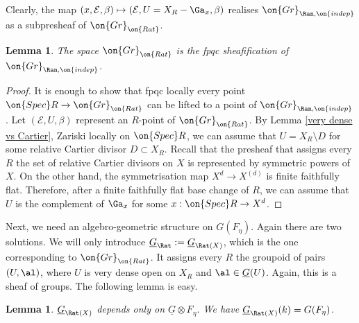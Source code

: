 \documentclass[]{pcmi}
\theoremstyle{plain}
\newtheorem{lem}[equation]{Lemma}
\theoremstyle{remark}
\theoremstyle{definition}
\newcommand{\mE}{{\mathcal E}}
\newcommand{\Gr}{{\on{Gr}}}
\newcommand{\Spec}{\on{Spec}}
\begin{document}
Clearly, the map $(x,\mE,\beta)\mapsto (\mE,U=X_R-\Ga_x,\beta)$ realises $\Gr_{\Ran,\on{indep}}$ as a subpresheaf of $\Gr_{\on{Rat}}$.
\begin{lem}\label{sheafify Ran}
The space  $\Gr_{\on{Rat}}$ is the fpqc sheafification of $\Gr_{\Ran,\on{indep}}$.
\end{lem}
\begin{proof}It is enough to show that fpqc locally every point $\Spec R\to \Gr_{\on{Rat}}$ can be lifted to a point of  $\Gr_{\Ran,\on{indep}}$. Let $(\mE,U, \beta)$ represent an $R$-point of $\Gr_{\on{Rat}}$. By Lemma \ref{very dense vs Cartier}, Zariski locally on $\Spec R$, we can assume that $U=X_R\setminus D$ for some relative Cartier divisor $D\subset X_R$. Recall that the presheaf that assigns every $R$ the set of relative Cartier divisors on $X$ is represented by symmetric powers of $X$. On the other hand, the symmetrisation map $X^d\to X^{(d)}$ is finite faithfully flat. Therefore, after a finite faithfully flat base change of $R$, we can assume that $U$ is the complement of $\Ga_x$ for some $x:\Spec R\to X^d$.
\end{proof}

Next, we need an algebro-geometric structure on $G(F_\eta)$. Again there are two solutions. We will only introduce 
${\underline G}_{\Rat}:={\underline G}_{\Rat(X)}$, which is the one corresponding to $\Gr_{\on{Rat}}$. It
 assigns every $R$ the groupoid of pairs $(U,\al)$, where $U$ is very dense open on $X_R$ and $\al\in \underline G(U)$. Again, this is a sheaf of groups. The following lemma is easy.
\begin{lem}\label{generic dependence}
${\underline G}_{\Rat(X)}$ depends only on $\underline G\otimes F_\eta$.
We have ${\underline G}_{\Rat(X)}(k)=G(F_\eta)$.
\end{lem}
\end{document}
